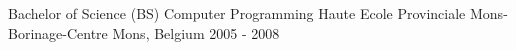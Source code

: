 

\begin{cventries}

  \cventry
    {Bachelor of Science (BS) Computer Programming} %
    {Haute Ecole Provinciale Mons-Borinage-Centre} %
    {Mons, Belgium} %
    {2005 - 2008} %
    {
    }

\end{cventries}
